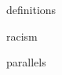\documentclass[12pt,2headlines,a4paper,oneside,bibtotoc]{scrartcl}
\begin{document}
\thispagestyle{empty}


\newpage

\setcounter{page}{1}

\tableofcontents
\newpage

\onehalfspacing


\newpage

\newpage



\newpage


 {definitions}
\newpage


 {racism}
\newpage

 {parallels}
\newpage
\end{document}

